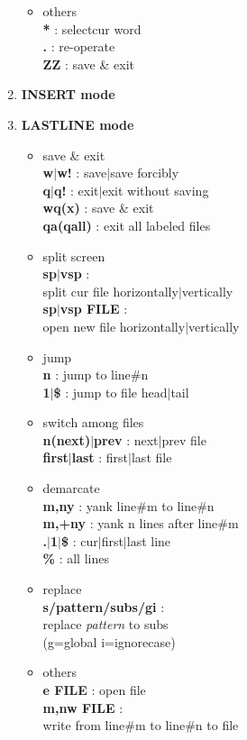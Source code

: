 \documentclass[10pt, a4paper]{article}
\begin{document}
\begin{enumerate}
\begin{itemize}
	\item others \\
	\textbf{*} : selectcur word \\
	\textbf{.} : re-operate \\
	\textbf{ZZ} : save \& exit
	\end{itemize}
\item{\textbf{INSERT mode}}
\item{\textbf{LASTLINE mode}}
	\begin{itemize}
	\item save \& exit \\
	\textbf{w{$|$}w!} : save{$|$}save forcibly \\
	\textbf{q{$|$}q!} : exit{$|$}exit without saving \\ 
	\textbf{wq(x)} : save \& exit \\
	\textbf{qa(qall)} : exit all labeled files
	\item split screen \\
	\textbf{sp{$|$}vsp} : \\ split cur file horizontally{$|$}vertically \\
	\textbf{sp{$|$}vsp FILE} : \\ open new file horizontally{$|$}vertically
	\item jump \\
	\textbf{n} : jump to line\#n \\
	\textbf{1{$|$}\$} : jump to file head{$|$}tail
	\item switch among files \\
	\textbf{n(next){$|$}prev} : next{$|$}prev file \\
	\textbf{first{$|$}last} : first{$|$}last file
	\item demarcate \\
	\textbf{m,ny} : yank line\#m to line\#n \\
	\textbf{m,+ny} : yank n lines after line\#m \\  
	\textbf{.{$|$}1{$|$}\$} : cur{$|$}first{$|$}last line \\
	\textbf{\%} : all lines 
	\item replace \\
	\textbf{s/pattern/subs/gi} : \\ replace \textit{pattern} to subs \\ (g=global i=ignorecase)
	\item others \\
	\textbf{e FILE} : open file \\
	\textbf{m,nw FILE} : \\ write from line\#m to line\#n to file \\

\end{itemize}
\end{enumerate}
\end{document}
